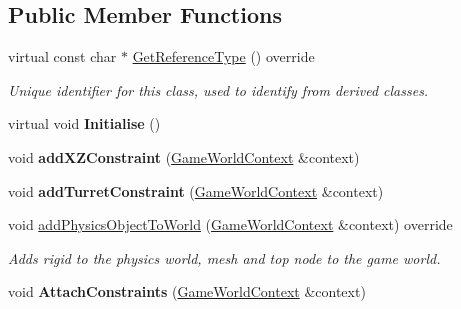 \subsection*{Public Member Functions}
\begin{DoxyCompactItemize}
\item 
\hypertarget{class_arena_1_1_player_aa22c5cdce358781bc98892b1e2829bf2}{virtual const char $\ast$ \hyperlink{class_arena_1_1_player_aa22c5cdce358781bc98892b1e2829bf2}{Get\+Reference\+Type} () override}\label{class_arena_1_1_player_aa22c5cdce358781bc98892b1e2829bf2}

\begin{DoxyCompactList}\small\item\em Unique identifier for this class, used to identify from derived classes. \end{DoxyCompactList}\item 
\hypertarget{class_arena_1_1_player_a9b5949b4c56768c6132397360587af47}{virtual void {\bfseries Initialise} ()}\label{class_arena_1_1_player_a9b5949b4c56768c6132397360587af47}

\item 
\hypertarget{class_arena_1_1_player_ac5c4458824f47742bb3816cc3a693ccd}{void {\bfseries add\+X\+Z\+Constraint} (\hyperlink{struct_arena_1_1_game_world_context}{Game\+World\+Context} \&context)}\label{class_arena_1_1_player_ac5c4458824f47742bb3816cc3a693ccd}

\item 
\hypertarget{class_arena_1_1_player_a4d4c157ae313fc2b9560225e066b7590}{void {\bfseries add\+Turret\+Constraint} (\hyperlink{struct_arena_1_1_game_world_context}{Game\+World\+Context} \&context)}\label{class_arena_1_1_player_a4d4c157ae313fc2b9560225e066b7590}

\item 
\hypertarget{class_arena_1_1_player_a8816424a271312fd584b8cda77c9d959}{void \hyperlink{class_arena_1_1_player_a8816424a271312fd584b8cda77c9d959}{add\+Physics\+Object\+To\+World} (\hyperlink{struct_arena_1_1_game_world_context}{Game\+World\+Context} \&context) override}\label{class_arena_1_1_player_a8816424a271312fd584b8cda77c9d959}

\begin{DoxyCompactList}\small\item\em Adds rigid to the physics world, mesh and top node to the game world. \end{DoxyCompactList}\item 
\hypertarget{class_arena_1_1_player_a4fd4eb5692672d246124137d46648093}{void {\bfseries Attach\+Constraints} (\hyperlink{struct_arena_1_1_game_world_context}{Game\+World\+Context} \&context)}\label{class_arena_1_1_player_a4fd4eb5692672d246124137d46648093}


\end{DoxyCompactItemize}
